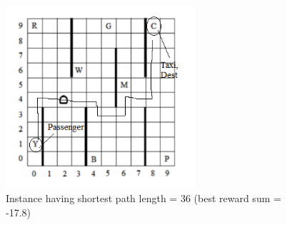 \documentclass{article}
\begin{document}
\begin{enumerate}[a)]
\begin{center}
    \begin{figure}[H]
    \hfill\includegraphics[width=7cm]{instance.png}\hspace*{\fill}
    \caption{Instance having shortest path length = 36 (best reward sum = -17.8)}
    \label{fig: Instance having shortest path length = 36 }
\end{figure}
\end{center}
\end{enumerate}
\end{document}
